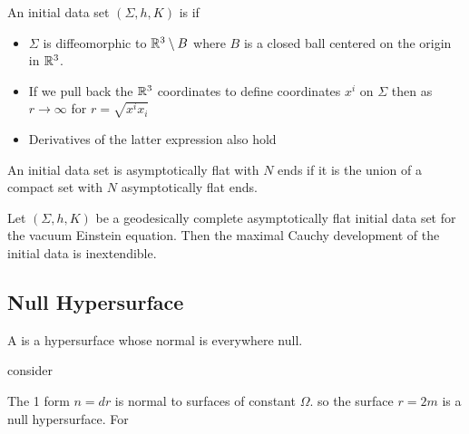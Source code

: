 \documentclass{article}
\begin{document}
\begin{definition}
An initial data set $(\Sigma,h,K)$ is  if 
\begin{itemize}
    \item $\Sigma$ is diffeomorphic to $\mathbb{R}^3\setminus B $ where $B$ is a closed ball centered on the origin in $\mathbb{R}^3$. 
    \item If we pull back the $\mathbb{R}^3$ coordinates to define coordinates $x^i$ on $\Sigma$ then 
    as $r\to\infty$ for $r=\sqrt{x^i x_i}$
    \item Derivatives of the latter expression also hold 
\end{itemize}
An initial data set is asymptotically flat with $N$ ends if it is the union of a compact set with $N$ asymptotically flat ends. 
\end{definition}

\begin{theorem}
Let $(\Sigma,h,K)$ be a geodesically complete asymptotically flat initial data set for the vacuum Einstein equation. Then  the maximal Cauchy development of the initial data is inextendible. 
\end{theorem}

\subsection{Null Hypersurface}

\begin{definition}
A  is a hypersurface whose normal is everywhere null. 
\end{definition}

\begin{example}
consider

The 1 form $n=dr$ is normal to surfaces of constant $\Omega$. 
so the surface $r=2m$ is a null hypersurface. For 
\end{example}
\end{document}
